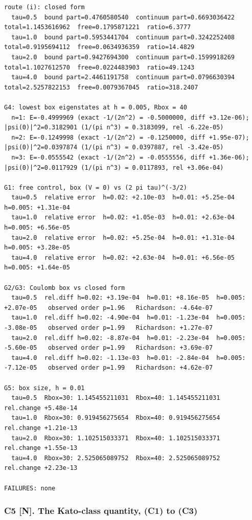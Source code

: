 \documentclass[11pt,a4paper]{article}
\begin{document}
\begin{lstlisting}
route (i): closed form
  tau=0.5  bound part=0.4760580540  continuum part=0.6693036422  total=1.1453616962  free=0.1795871221  ratio=6.3777
  tau=1.0  bound part=0.5953441704  continuum part=0.3242252408  total=0.9195694112  free=0.0634936359  ratio=14.4829
  tau=2.0  bound part=0.9427694300  continuum part=0.1599918269  total=1.1027612570  free=0.0224483903  ratio=49.1243
  tau=4.0  bound part=2.4461191758  continuum part=0.0796630394  total=2.5257822153  free=0.0079367045  ratio=318.2407

G4: lowest box eigenstates at h = 0.005, Rbox = 40
  n=1: E=-0.4999969 (exact -1/(2n^2) = -0.5000000, diff +3.12e-06);  |psi(0)|^2=0.3182901 (1/(pi n^3) = 0.3183099, rel -6.22e-05)
  n=2: E=-0.1249998 (exact -1/(2n^2) = -0.1250000, diff +1.95e-07);  |psi(0)|^2=0.0397874 (1/(pi n^3) = 0.0397887, rel -3.42e-05)
  n=3: E=-0.0555542 (exact -1/(2n^2) = -0.0555556, diff +1.36e-06);  |psi(0)|^2=0.0117929 (1/(pi n^3) = 0.0117893, rel +3.06e-04)

G1: free control, box (V = 0) vs (2 pi tau)^(-3/2)
  tau=0.5  relative error  h=0.02: +2.10e-03  h=0.01: +5.25e-04  h=0.005: +1.31e-04
  tau=1.0  relative error  h=0.02: +1.05e-03  h=0.01: +2.63e-04  h=0.005: +6.56e-05
  tau=2.0  relative error  h=0.02: +5.25e-04  h=0.01: +1.31e-04  h=0.005: +3.28e-05
  tau=4.0  relative error  h=0.02: +2.63e-04  h=0.01: +6.56e-05  h=0.005: +1.64e-05

G2/G3: Coulomb box vs closed form
  tau=0.5  rel.diff h=0.02: +3.19e-04  h=0.01: +8.16e-05  h=0.005: +2.07e-05   observed order p=1.96   Richardson: -4.64e-07
  tau=1.0  rel.diff h=0.02: -4.90e-04  h=0.01: -1.23e-04  h=0.005: -3.08e-05   observed order p=1.99   Richardson: +1.27e-07
  tau=2.0  rel.diff h=0.02: -8.87e-04  h=0.01: -2.23e-04  h=0.005: -5.60e-05   observed order p=1.99   Richardson: +3.69e-07
  tau=4.0  rel.diff h=0.02: -1.13e-03  h=0.01: -2.84e-04  h=0.005: -7.12e-05   observed order p=1.99   Richardson: +4.62e-07

G5: box size, h = 0.01
  tau=0.5  Rbox=30: 1.145455211031  Rbox=40: 1.145455211031  rel.change +5.48e-14
  tau=1.0  Rbox=30: 0.919456275654  Rbox=40: 0.919456275654  rel.change +1.21e-13
  tau=2.0  Rbox=30: 1.102515033371  Rbox=40: 1.102515033371  rel.change +1.55e-13
  tau=4.0  Rbox=30: 2.525065089752  Rbox=40: 2.525065089752  rel.change +2.23e-13

FAILURES: none
\end{lstlisting}

\hypertarget{c5-n.-the-kato-class-quantity-c1-to-c3}{%
\subsubsection{C5 {[}N{]}. The Kato-class quantity, (C1) to (C3)}\label{c5-n.-the-kato-class-quantity-c1-to-c3}}
\end{document}
